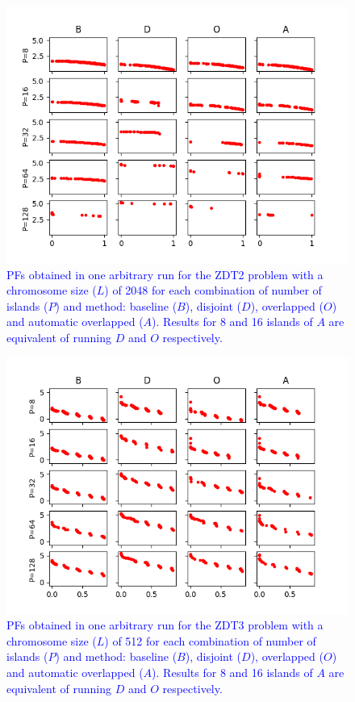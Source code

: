\documentclass[preprint]{elsarticle}
\begin{document}
\begin{figure}
\centering
\includegraphics[width=12cm]{plot_zdt2_2048.png}
\caption{\textcolor{blue}{PFs obtained in one arbitrary run for the ZDT2 problem with a chromosome size ($L$) of 2048 for each combination of number of islands ($P$) and method: baseline ($B$), disjoint ($D$), overlapped ($O$) and automatic overlapped ($A$). Results for 8 and 16 islands of $A$ are equivalent of running $D$ and $O$ respectively. }}
\label{fig:plot_zdt2_2048}
\end{figure}





\begin{figure}
\centering
\includegraphics[width=12cm]{plot_zdt3_512.png}
\caption{\textcolor{blue}{PFs obtained in one arbitrary run for the ZDT3 problem with a chromosome size ($L$) of 512 for each combination of number of islands ($P$) and method: baseline ($B$), disjoint ($D$), overlapped ($O$) and automatic overlapped ($A$). Results for 8 and 16 islands of $A$ are equivalent of running $D$ and $O$ respectively. }}
\label{fig:plot_zdt3_512}
\end{figure}
\end{document}
